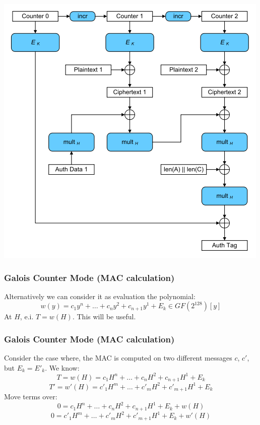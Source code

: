\documentclass{beamer}
\begin{document}
\begin{frame}
\begin{center}
\includegraphics[height=0.9\textheight]{mode-gcm.png}
\end{center}
\end{frame}

\begin{frame}
\frametitle{Galois Counter Mode (MAC calculation)}
Alternatively we can consider it as evaluation the polynomial:
\[
    w(y) = c_{1} y^{n} + \ldots + c_{n} y^{2} + c_{n+1} y^{1} + E_{k} \in GF(2^{128})[y]
\]
At $H$, e.i. $T = w(H)$.
This will be useful.
\end{frame}

\begin{frame}
\frametitle{Galois Counter Mode (MAC calculation)}
Consider the case where, the MAC is computed on two different messages $c$, $c'$,
but $E_{k} = E'_{k}$.
We know:
\[
    T = w(H) = c_{1} H^{n} + \ldots + c_{n} H^{2} + c_{n+1} H^{1} + E_{k}
\]
\[
    T' = w'(H) = c'_{1} H^{m} + \ldots + c'_{m} H^{2} + c'_{m+1} H^{1} + E_{k}
\]
Move terms over:
\[
    0 = c_{1} H^{n} + \ldots + c_{n} H^{2} + c_{n+1} H^{1} + E_{k} + w(H)
\]
\[
    0 = c'_{1} H^{m} + \ldots + c'_{m} H^{2} + c'_{m+1} H^{1} + E_{k} + w'(H)
\]
\end{frame}
\end{document}
